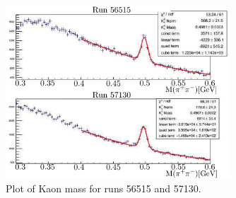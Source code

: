 \begin{figure}\begin{center}
\includegraphics[width=0.75\textwidth]{figures/calib/tag/ecor/Kaon_mass.eps}
\caption[Kaon Mass for Run 56515 and 57130]{\label{fig:beamcor.k_mass}Plot of Kaon mass for runs 56515 and 57130.}
\end{center}\end{figure}

\FloatBarrier

